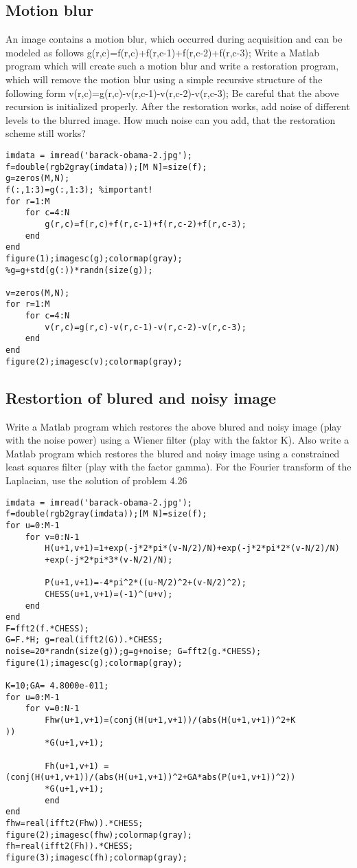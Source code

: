 \subsection{Motion blur}
An image contains a motion blur, which occurred during acquisition and can be modeled as follows g(r,c)=f(r,c)+f(r,c-1)+f(r,c-2)+f(r,c-3);
Write a Matlab program which will create such a motion blur and write a restoration program, which will remove the motion blur using a simple recursive structure of the following form  v(r,c)=g(r,c)-v(r,c-1)-v(r,c-2)-v(r,c-3);
Be careful that the above recursion is initialized properly. After the restoration works, add noise of different levels to the blurred image. How much noise can you add, that the restoration scheme still works?
\begin{lstlisting}
imdata = imread('barack-obama-2.jpg');
f=double(rgb2gray(imdata));[M N]=size(f);
g=zeros(M,N);
f(:,1:3)=g(:,1:3); %important!
for r=1:M
    for c=4:N
        g(r,c)=f(r,c)+f(r,c-1)+f(r,c-2)+f(r,c-3);
    end
end
figure(1);imagesc(g);colormap(gray);
%g=g+std(g(:))*randn(size(g));

v=zeros(M,N);
for r=1:M
    for c=4:N
        v(r,c)=g(r,c)-v(r,c-1)-v(r,c-2)-v(r,c-3);
    end
end
figure(2);imagesc(v);colormap(gray);
\end{lstlisting}
\subsection{Restortion of blured and noisy image}
Write a Matlab program which restores the above blured and noisy image (play
with the noise power) using a Wiener filter (play with the faktor K). Also write a Matlab program which restores the blured and noisy image using a constrained least squares filter (play with the factor gamma). For the Fourier transform of the Laplacian, use the solution of problem 4.26
\begin{lstlisting}
imdata = imread('barack-obama-2.jpg');
f=double(rgb2gray(imdata));[M N]=size(f);
for u=0:M-1
    for v=0:N-1
        H(u+1,v+1)=1+exp(-j*2*pi*(v-N/2)/N)+exp(-j*2*pi*2*(v-N/2)/N)
        +exp(-j*2*pi*3*(v-N/2)/N);
        
        P(u+1,v+1)=-4*pi^2*((u-M/2)^2+(v-N/2)^2);
        CHESS(u+1,v+1)=(-1)^(u+v);
    end
end
F=fft2(f.*CHESS);
G=F.*H; g=real(ifft2(G)).*CHESS;
noise=20*randn(size(g));g=g+noise; G=fft2(g.*CHESS);
figure(1);imagesc(g);colormap(gray);

K=10;GA= 4.8000e-011;
for u=0:M-1
    for v=0:N-1
        Fhw(u+1,v+1)=(conj(H(u+1,v+1))/(abs(H(u+1,v+1))^2+K                   ))
        *G(u+1,v+1);
        
        Fh(u+1,v+1) =(conj(H(u+1,v+1))/(abs(H(u+1,v+1))^2+GA*abs(P(u+1,v+1))^2))
        *G(u+1,v+1);
        end
end
fhw=real(ifft2(Fhw)).*CHESS;
figure(2);imagesc(fhw);colormap(gray);
fh=real(ifft2(Fh)).*CHESS;
figure(3);imagesc(fh);colormap(gray);
\end{lstlisting}
